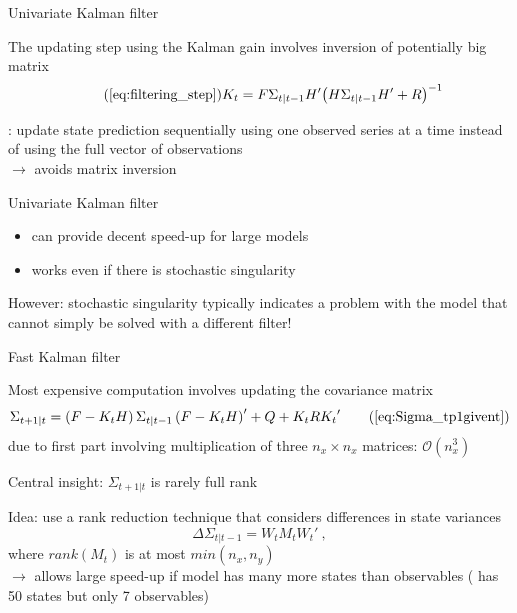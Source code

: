 \documentclass[handout,usepdftitle=false,xcolor=dvipsnames,aspectratio=169]{beamer}
\begin{document}
\begin{frame}{Univariate Kalman filter}

  \begin{witemize}
    \item The updating step using the Kalman gain involves inversion of potentially big matrix
    \begin{equation}\tag{\ref{eq:filtering_step}}
      K_t=F{\Sigma _{t|t-1}}H'{\left( {H{\Sigma _{t|t-1}}H' + R} \right)^{ - 1}}
    \end{equation}
    \item \textcite{KoopmanDurbin2000}: update state prediction sequentially using one observed series at a time instead of using the full vector of observations\\
    $\rightarrow$  avoids matrix inversion
    \item Univariate Kalman filter
    \begin{itemize}
      \item can provide decent speed-up for large models
      \item works even if there is stochastic singularity
    \end{itemize}
    \item However: stochastic singularity typically indicates a problem with the model that cannot simply be solved with a different filter!
  \end{witemize}

\end{frame}


\begin{frame}{Fast Kalman filter}

  \begin{witemize}
    \item Most expensive computation involves updating the covariance matrix
    \begin{equation}
      \Sigma_{t+1|t} = \left( {F - {K_t}H} \right){\Sigma _{t|t-1}}\left( {F - {K_t}H} \right)' + Q + {K_t}R{K_t}' \tag{\ref{eq:Sigma_tp1givent}}
    \end{equation}
    due to first part involving multiplication of three $n_x \times n_x$ matrices: $\mathcal{O}(n_x^3)$
    \item Central insight: $\Sigma_{t+1|t}$ is rarely full rank
    \item Idea: use a rank reduction technique that considers differences in state variances
    \begin{equation}
      \Delta \Sigma_{t|t-1}=W_tM_tW_t' \: ,
    \end{equation}
    where $rank(M_t)$ is at most $min(n_x,n_y)$\\
    $\rightarrow$ allows large speed-up if model has many more states than observables (\textcite{SmetsWouters2007} has 50 states but only 7 observables)
  \end{witemize}

\end{frame}
\end{document}
